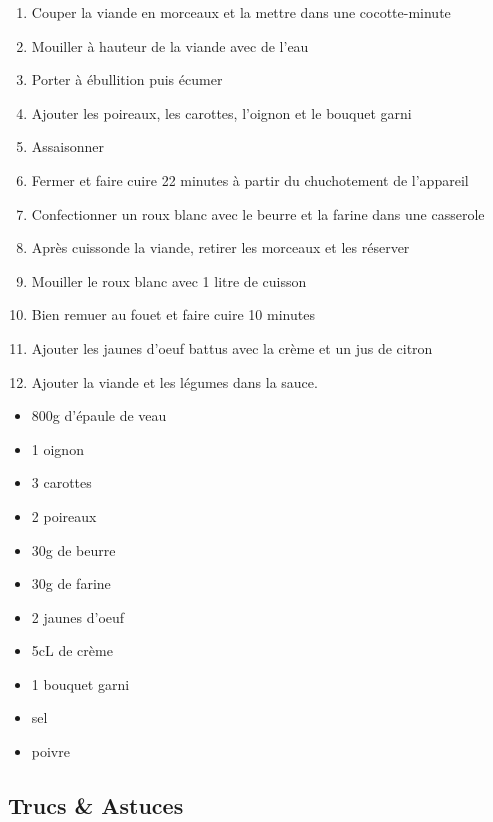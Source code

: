     \begin{minipage}{.7\textwidth}
        \begin{enumerate}
            \item Couper la viande en morceaux et la mettre dans une cocotte-minute
	    \item Mouiller à hauteur de la viande avec de l'eau
	    \item Porter à ébullition puis écumer
	    \item Ajouter les poireaux, les carottes, l'oignon et le bouquet garni
	    \item Assaisonner
	    \item Fermer et faire cuire 22 minutes à partir du chuchotement de l'appareil
	    \item Confectionner un roux blanc avec le beurre et la farine dans une casserole
	    \item Après cuissonde la viande, retirer les morceaux et les réserver
	    \item Mouiller le roux blanc avec 1 litre de cuisson
	    \item Bien remuer au fouet et faire cuire 10 minutes
	    \item Ajouter les jaunes d'oeuf battus avec la crème et un jus de citron
	    \item Ajouter la viande et les légumes dans la sauce.

        \end{enumerate}
    \end{minipage}
    \begin{minipage}{.3\textwidth}
        \begin{flushleft}
        \begin{itemize}
            \item 800g d'épaule de veau
	    \item 1 oignon
	    \item 3 carottes
	    \item 2 poireaux
	    \item 30g de beurre
	    \item 30g de farine
	    \item 2 jaunes d'oeuf
	    \item 5cL de crème
	    \item 1 bouquet garni
	    \item sel
	    \item poivre

        \end{itemize}
        \end{flushleft}
    \end{minipage}
    
    \vspace{1cm}
    \hline
    \vspace{1cm}
    
    \subsection{Trucs \& Astuces}
        
